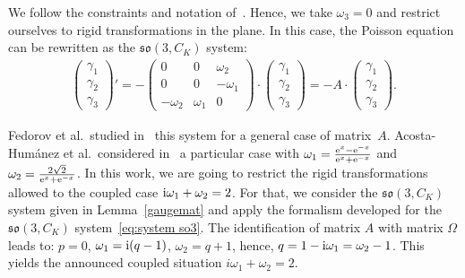 \documentclass[pdftex]{sigma}%
\numberwithin{equation}{section}
\begin{document}
We follow the constraints and notation of~\cite{femapr}. Hence, we take $\omega_3 =0$ and restrict ourselves to rigid transformations in the plane. In this case, the Poisson equation can be rewritten as the $\mathfrak{so}(3, C_K)$ system:
\begin{gather*}%
 \begin{pmatrix} \gamma_1 \\ \gamma_2 \\ \gamma_3 \end{pmatrix}' = - \begin{pmatrix}
0 & 0 & \omega_2 \\ 0 & 0 & - \omega_1 \\ -\omega_2 & \omega_1 & 0 \end{pmatrix} \cdot \begin{pmatrix} \gamma_1 \\ \gamma_2 \\ \gamma_3 \end{pmatrix} = - A \cdot \begin{pmatrix} \gamma_1 \\ \gamma_2 \\ \gamma_3 \end{pmatrix}\!.
\end{gather*}

Fedorov et al.\ studied in~\cite{femapr} this system for a general case of matrix~$A$. Acosta-Hum\'anez et al.\ considered in~\cite{acjios} a particular case with $\omega_1 = \frac{{\rm e}^x - {\rm e}^{-x}}{{\rm e}^x + {\rm e}^{-x}}$ and $\omega_2 = \frac{2 \sqrt{2}}{{\rm e}^x + {\rm e}^{-x}}$. In this work, we are going to restrict the rigid transformations allowed to the coupled case ${\rm i}\omega_1 + \omega_2 = 2$.
For that, we consider the $\mathfrak{so}(3, C_K)$ system given in Lemma~\ref{gaugemat} and apply the formalism developed for the $\mathfrak{so}(3, C_K)$ system~\eqref{eq:system so3}.
The identification of matrix $A$ with matrix $\Omega$ leads to: $p=0$, $\omega_1 = {\rm i}(q-1)$, $\omega_2 = q+1$, hence, $q = 1- {\rm i}\omega_1 = \omega_2 -1$. This yields the announced coupled situation $i\omega_1 + \omega_2 = 2$.
\end{document}
